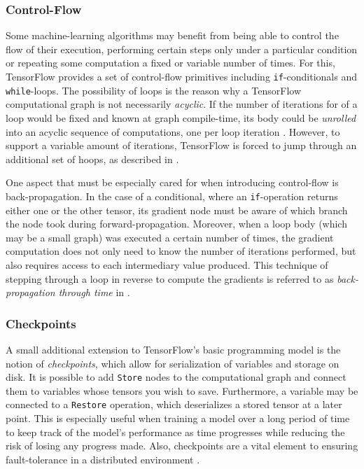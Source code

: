 \subsubsection{Control-Flow}\label{sec:model-ext-flow}

Some machine-learning algorithms may benefit from being able to control the flow
of their execution, performing certain steps only under a particular condition
or repeating some computation a fixed or variable number of times. For this,
TensorFlow provides a set of control-flow primitives including
\texttt{if}-conditionals and \texttt{while}-loops. The possibility of loops is
the reason why a TensorFlow computational graph is not necessarily
\emph{acyclic}. If the number of iterations for of a loop would be fixed and
known at graph compile-time, its body could be \emph{unrolled} into an acyclic
sequence of computations, one per loop iteration \cite{theano}. However, to
support a variable amount of iterations, TensorFlow is forced to jump through an
additional set of hoops, as described in \cite{tensorflow}.

One aspect that must be especially cared for when introducing control-flow is
back-propagation. In the case of a conditional, where an \texttt{if}-operation
returns either one or the other tensor, its gradient node must be aware of which
branch the node took during forward-propagation. Moreover, when a loop body
(which may be a small graph) was executed a certain number of times, the
gradient computation does not only need to know the number of iterations
performed, but also requires access to each intermediary value produced. This
technique of stepping through a loop in reverse to compute the gradients is
referred to as \emph{back-propagation through time} in \cite{theano}.

\subsubsection{Checkpoints}\label{sec:model-ext-check}

A small additional extension to TensorFlow's basic programming model is the
notion of \emph{checkpoints}, which allow for serialization of variables and
storage on disk. It is possible to add \texttt{Store} nodes to the computational
graph and connect them to variables whose tensors you wish to save. Furthermore,
a variable may be connected to a \texttt{Restore} operation, which deserializes
a stored tensor at a later point. This is especially useful when training a
model over a long period of time to keep track of the model's performance as
time progresses while reducing the risk of losing any progress made. Also,
checkpoints are a vital element to ensuring fault-tolerance in a distributed
environment \cite{tensorflow}.

